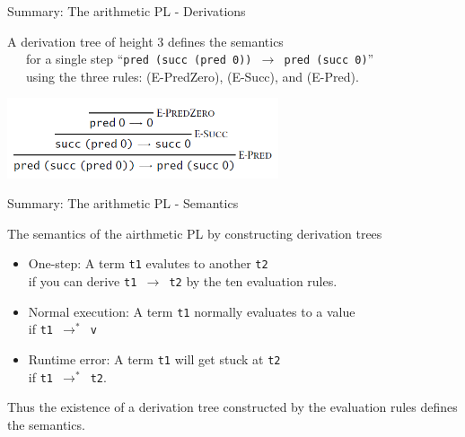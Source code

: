 \documentclass[table]{beamer}
\begin{document}
\begin{frame}[t]{Summary: The arithmetic PL - Derivations}  \vspace{10pt}

A derivation tree of height 3 defines the semantics \\
\ \ \ for a single step ``\texttt{pred (succ (pred 0)) $\rightarrow$ pred (succ 0)}'' \\
\ \ \ using the three rules: (E-PredZero), (E-Succ), and (E-Pred).

\vspace{10pt}

\begin{center}
\includegraphics[width=8cm]{derivation_ch3}
\end{center}

\end{frame}

\begin{frame}[t]{Summary: The arithmetic PL - Semantics} \vspace{10pt}

The semantics of the airthmetic PL by constructing derivation trees

\vspace{10pt}

\begin{itemize}
\item One-step: A term \texttt{t1} evalutes to another \texttt{t2}\\
if you can derive \texttt{t1 $\rightarrow$ t2} by the ten evaluation rules.
\item Normal execution: A term \texttt{t1} normally evaluates to a value \\
if \texttt{t1 $\rightarrow^*$ v}
\item Runtime error: A term \texttt{t1} will get stuck at \texttt{t2} \\ if \texttt{t1 $\rightarrow^*$ t2}.
\end{itemize}

\vspace{10pt}

Thus the existence of a derivation tree constructed by the evaluation rules defines the semantics. 

\end{frame}
\end{document}
